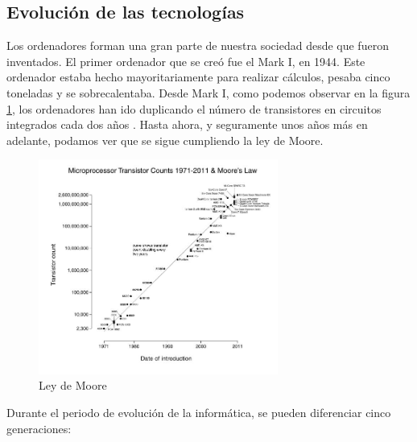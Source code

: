 \documentclass[twoside, titlepage, 12pt, a4paper]{article}
\begin{document}
\subsection{Evolución de las tecnologías}
Los ordenadores forman una gran parte de nuestra sociedad desde que fueron inventados. El primer ordenador que se creó fue el Mark I, en 1944. Este ordenador estaba hecho mayoritariamente para realizar cálculos, pesaba cinco toneladas y se sobrecalentaba.
Desde Mark I, como podemos observar en la figura \ref{fig:moore}, los ordenadores han ido duplicando el número de transistores en circuitos integrados cada dos años \cite{moore}. Hasta ahora, y seguramente unos años más en adelante, podamos ver que se sigue cumpliendo la ley de Moore.
\begin{figure}[H]
    \centering
    \includegraphics[width=0.7\textwidth]{Media/moore.jpg}
    \caption{Ley de Moore}
    \label{fig:moore}
\end{figure}
Durante el periodo de evolución de la informática, se pueden diferenciar cinco generaciones:
\end{document}
